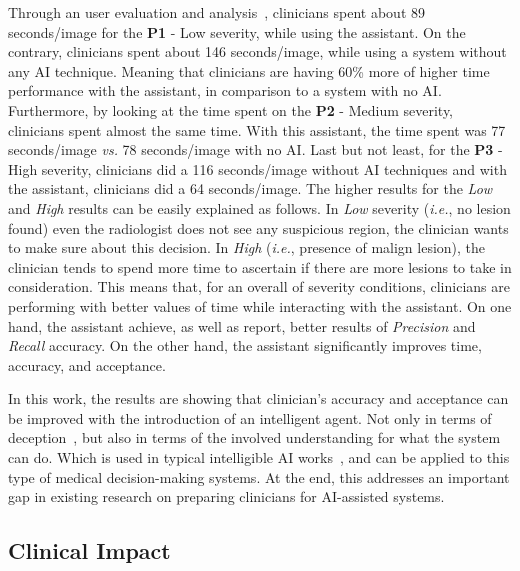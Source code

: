 Through an user evaluation and analysis~\cite{https://doi.org/10.13140/rg.2.2.16566.14403/1}, clinicians spent about 89 seconds/image for the {\bf P1} - Low severity, while using the assistant.
On the contrary, clinicians spent about 146 seconds/image, while using a system without any \ac{AI} technique.
Meaning that clinicians are having 60\% more of higher time performance with the assistant, in comparison to a system with no \ac{AI}.
Furthermore, by looking at the time spent on the {\bf P2} - Medium severity, clinicians spent almost the same time.
With this assistant, the time spent was 77 seconds/image {\it vs.} 78 seconds/image with no \ac{AI}.
Last but not least, for the {\bf P3} - High severity, clinicians did a 116 seconds/image without \ac{AI} techniques and with the assistant, clinicians did a 64 seconds/image.
The higher results for the {\it Low} and {\it High} results can be easily explained as follows.
In {\it Low} severity ({\it i.e.}, no lesion found) even the radiologist does not see any suspicious region, the clinician wants to make sure about this decision.
In {\it High} ({\it i.e.}, presence of malign lesion), the clinician tends to spend more time to ascertain if there are more lesions to take in consideration.
This means that, for an overall of severity conditions, clinicians are performing with better values of time while interacting with the assistant.
On one hand, the assistant achieve, as well as report, better results of {\it Precision} and {\it Recall} accuracy.
On the other hand, the assistant significantly improves time, accuracy, and acceptance.

In this work, the results are showing that clinician's accuracy and acceptance can be improved with the introduction of an intelligent agent.
Not only in terms of deception~\cite{hengstler2016applied}, but also in terms of the involved understanding for what the system can do.
Which is used in typical intelligible \ac{AI} works~\cite{10.1145/3173574.3174156}, and can be applied to this type of medical decision-making systems.
At the end, this addresses an important gap in existing research on preparing clinicians for \ac{AI}-assisted systems.

\subsection{Clinical Impact}
\label{sec:app002005001}

